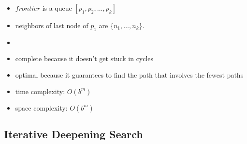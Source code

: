 \documentclass{article}
\begin{document}
\begin{itemize}
    \item $frontier$ is a queue $[p_1, p_2, \ldots, p_k]$
    \item neighbors of last node of $p_1$ are $\{n_1, \ldots, n_k\}$.
    \item
    \begin{algorithmic}
            \EndIf
        \EndWhile
    \end{algorithmic}
    \item complete because it doesn't get stuck in cycles
    \item optimal because it guarantees to find the path that involves the fewest paths
    \item time complexity: $O(b^m)$
    \item space complexity: $O(b^m)$
\end{itemize}

\subsection{Iterative Deepening Search}
\end{document}
